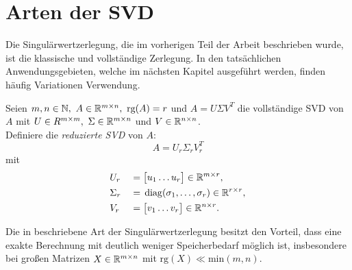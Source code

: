 \section{Arten der SVD}

Die Singulärwertzerlegung, die im vorherigen Teil der Arbeit beschrieben wurde, ist die klassische und vollständige Zerlegung.
In den tatsächlichen Anwendungsgebieten, welche im nächsten Kapitel ausgeführt werden, finden häufig Variationen Verwendung.
\begin{definition}\label{df:redsvd}
    Seien \(m,n \in \N,\ A \in \R^{m \times n},\ \text{rg}(A)=r\) und \(A=U \Sigma V^{T}\) die vollständige SVD von \(A\) mit \(U \in R^{m \times m},\ \Sigma \in \mathbb{R}^{m \times n}\) und \(V \in \mathbb{R}^{n \times n}\). \\
    Definiere die \textit{reduzierte SVD} von \(A\):
    \begin{equation*}
        A = U_r \Sigma_r V^{T}_r
    \end{equation*}
    mit
    \begin{alignat*}{2}
        &U_r &{}={}&
        \big[
        \begin{matrix}
            u_1 \dots u_{r}
        \end{matrix}
        \big]
        \in \mathbb{R}^{m \times r}, \\
        &\Sigma_r &{}={}&
        \operatorname{diag}(\sigma_1,\ldots,\sigma_r)
        \in \mathbb{R}^{r \times r}, \\
        &V_r &{}={}&
        \big[
        \begin{matrix}
            v_1 \dots v_{r}
        \end{matrix}
        \big]
        \in \mathbb{R}^{n \times r}.
    \end{alignat*}
\end{definition}
Die in  beschriebene Art der Singulärwertzerlegung besitzt den Vorteil, dass eine exakte Berechnung mit deutlich weniger Speicherbedarf möglich ist, insbesondere bei großen Matrizen \(X \in \mathbb{R}^{m \times n}\) mit \(\text{rg}(X) \ll \text{min}(m,n)\). 

